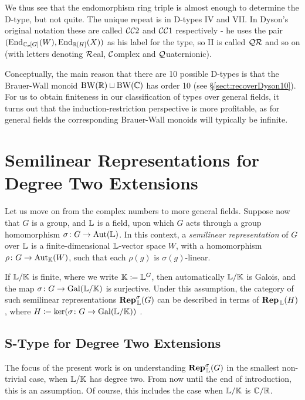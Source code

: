 We thus see that the endomorphism ring triple is almost enough to determine the D-type, but not quite. The unique repeat is in D-types IV and VII. In Dyson's original notation these are called ${\mathcal C} {\mathcal C} 2$ and ${\mathcal C} {\mathcal C} 1$ respectively - he uses the pair $(\operatorname{End}_{{\mathbb C}_{\sigma}\hspace{-0.1em}[G]}(W), \operatorname{End}_{{\mathbb R}[H]}(X))$ as his label for the type, so II is called ${\mathcal Q} {\mathcal R}$ and so on (with letters denoting ${\mathcal R}$eal, ${\mathcal C}$omplex and ${\mathcal Q}$uaternionic).

Conceptually, the main reason that there are 10 possible D-types is that the Brauer-Wall monoid $\operatorname{BW}({\mathbb R}) \sqcup \operatorname{BW}({\mathbb C})$ has order 10 (see \S \ref{sect:recoverDyson10}). For us to obtain finiteness in our classification of types over general fields, it turns out that the induction-restriction perspective is more profitable, as for general fields the corresponding Brauer-Wall monoids will typically be infinite.

\section*{Semilinear Representations for Degree Two Extensions}
Let us move on from the complex numbers to more general fields.
Suppose now that $G$ is a group, and ${\mathbb L}$ is a field, upon which $G$ acts through a group homomorphism $\sigma \colon G \rightarrow \operatorname{Aut}({\mathbb L})$.
In this context, a \emph{semilinear representation} of $G$ over ${\mathbb L}$ is a finite-dimensional ${\mathbb L}$-vector space $W$, with a homomorphism $\rho \colon G \rightarrow \operatorname{Aut}_{{\mathbb K}}(W)$, such that each $\rho(g)$ is $\sigma(g)$-linear.

If ${\mathbb L} / {\mathbb K}$ is finite, where we write ${\mathbb K} \coloneqq {\mathbb L}^G$, then automatically ${\mathbb L} / {\mathbb K}$ is Galois, and the map $\sigma \colon G \rightarrow \operatorname{Gal}({\mathbb L} / {\mathbb K})$ is surjective. Under this assumption, the category of such semilinear representations $\operatorname{\mathbf{Rep}}_{\, {\mathbb L}}^{\sigma}(G)$ can be described in terms of $\operatorname{\mathbf{Rep}}_{\, {\mathbb L}}(H)$, where $H \coloneqq \ker(\sigma \colon G \rightarrow \operatorname{Gal}({\mathbb L}/{\mathbb K}))$ \cite{TAYSchur}.

\subsection*{S-Type for Degree Two Extensions} 
The focus of the present work is on understanding $\operatorname{\mathbf{Rep}}_{\, {\mathbb L}}^{\sigma}(G)$ in the smallest non-trivial case, when ${\mathbb L} / {\mathbb K}$ has degree two. From now until the end of introduction, this is an assumption.
Of course, this includes the case when ${\mathbb L} / {\mathbb K}$ is ${\mathbb C} / {\mathbb R}$.

